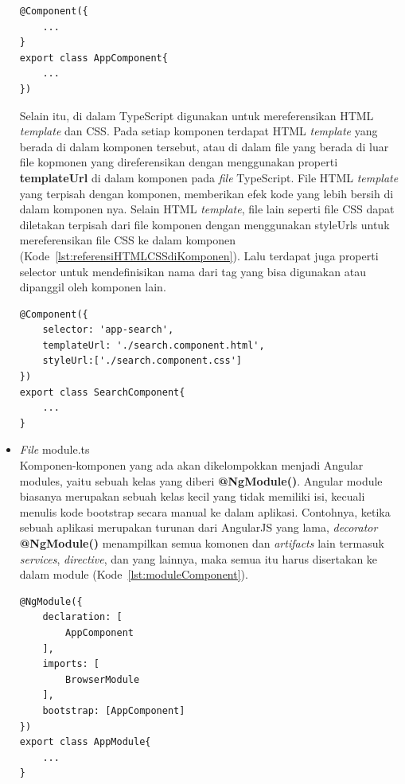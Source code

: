 \begin{itemize}
\begin{lstlisting}[label={lst:decorator}, caption=Anotasi Komponen dengan \textit{Decorator}]
@Component({
	...
}
export class AppComponent{
	...
})
\end{lstlisting} 

		Selain itu, di dalam TypeScript digunakan untuk mereferensikan HTML \textit{template} dan CSS. Pada setiap komponen terdapat HTML \textit{template} yang berada di dalam komponen tersebut, atau di dalam file yang berada di luar file kopmonen yang direferensikan dengan menggunakan properti \textbf{templateUrl} di dalam komponen pada \textit{file} TypeScript. File HTML \textit{template} yang terpisah dengan komponen, memberikan efek kode yang lebih bersih di dalam komponen nya. Selain HTML \textit{template}, file lain seperti file CSS dapat diletakan terpisah dari file komponen dengan menggunakan styleUrls untuk mereferensikan file CSS ke dalam komponen (Kode~\ref{lst:referensiHTMLCSSdiKomponen}). Lalu terdapat juga properti selector untuk mendefinisikan nama dari tag yang bisa digunakan atau dipanggil oleh komponen lain.

\begin{lstlisting}[label={lst:referensiHTMLCSSdiKomponen}, caption=Contoh Mereferensikan HTML dan CSS di Dalam Komponen]
@Component({
	selector: 'app-search',
	templateUrl: './search.component.html',
	styleUrl:['./search.component.css']
})
export class SearchComponent{
	...
}
\end{lstlisting} 

	\item \textit{File} module.ts \\
	Komponen-komponen yang ada akan dikelompokkan menjadi Angular modules, yaitu sebuah kelas yang diberi \textbf{@NgModule()}. Angular module biasanya merupakan sebuah kelas kecil yang tidak memiliki isi, kecuali menulis kode bootstrap secara manual ke dalam aplikasi. Contohnya, ketika sebuah aplikasi merupakan turunan dari AngularJS yang lama, \textit{decorator} \textbf{@NgModule()} menampilkan semua komonen dan \textit{artifacts} lain termasuk \textit{services}, \textit{directive}, dan yang lainnya, maka semua itu harus disertakan ke dalam module (Kode~\ref{lst:moduleComponent}). 

\newpage

\begin{lstlisting}[label={lst:moduleComponent}, caption=Module dengan Komponen]
@NgModule({
	declaration: [
		AppComponent
	],
	imports: [
		BrowserModule	
	],
	bootstrap: [AppComponent]
})
export class AppModule{
	...
}
\end{lstlisting} 
\end{itemize}

